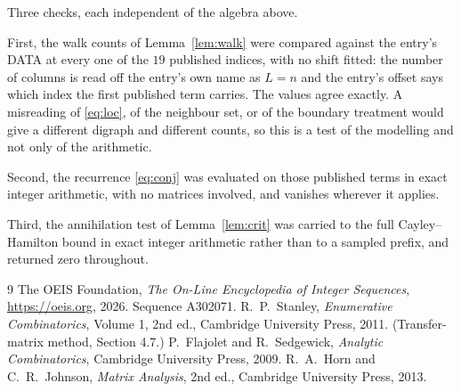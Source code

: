 \documentclass[11pt,a4paper]{article}
\theoremstyle{plain}
\theoremstyle{definition}
\begin{document}
Three checks, each independent of the algebra above.

First, the walk counts of Lemma~\ref{lem:walk} were compared against the entry's DATA at
every one of the $19$ published indices, with no shift fitted: the number of columns is
read off the entry's own name as $L=n$ and the entry's offset says which index the first
published term carries. The values agree exactly. A misreading of \eqref{eq:loc}, of the
neighbour set, or of the boundary treatment would give a different digraph and different
counts, so this is a test of the modelling and not only of the arithmetic.

Second, the recurrence \eqref{eq:conj} was evaluated on those published terms in exact
integer arithmetic, with no matrices involved, and vanishes wherever it applies.

Third, the annihilation test of Lemma~\ref{lem:crit} was carried to the full
Cayley--Hamilton bound in exact integer arithmetic rather than to a sampled prefix, and
returned zero throughout.

\begin{thebibliography}{9}
 The OEIS Foundation, \emph{The On-Line Encyclopedia of Integer
Sequences}, \url{https://oeis.org}, 2026. Sequence A302071.
 R.~P.~Stanley, \emph{Enumerative Combinatorics}, Volume 1, 2nd ed.,
Cambridge University Press, 2011. (Transfer-matrix method, Section 4.7.)
 P.~Flajolet and R.~Sedgewick, \emph{Analytic Combinatorics}, Cambridge
University Press, 2009.
 R.~A.~Horn and C.~R.~Johnson, \emph{Matrix Analysis}, 2nd ed., Cambridge
University Press, 2013.
\end{thebibliography}
\end{document}
